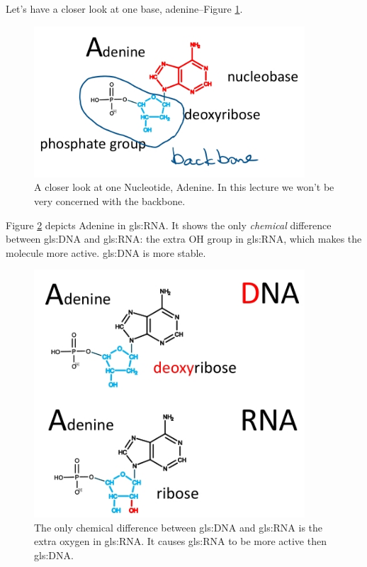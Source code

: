 \documentclass[]{article}
\begin{document}
Let's have a closer look at one base, adenine--Figure \ref{fig:NucleotideAdenine}.
\begin{figure}[H]
	\caption[A closer look at one Nucleotide, Adenine]{A closer look at one Nucleotide, Adenine. In this lecture we won't be very concerned with the backbone.}\label{fig:NucleotideAdenine} 
	\includegraphics[width=0.9\textwidth]{NucleotideAdenine}
\end{figure}

Figure \ref{fig:NucleotideDNARNA} depicts Adenine in \gls{gls:RNA}. It shows the only \emph{chemical} difference between \gls{gls:DNA} and \gls{gls:RNA}: the extra OH group in \gls{gls:RNA}, which makes the molecule more active. \gls{gls:DNA} is more stable.
\begin{figure}[H]
	\caption[Chemical difference between DNA and RNA is the extra oxygen]{The only chemical difference between \gls{gls:DNA} and \gls{gls:RNA} is the extra oxygen in \gls{gls:RNA}. It causes \gls{gls:RNA} to be more active then \gls{gls:DNA}.}\label{fig:NucleotideDNARNA} 
	\includegraphics[width=0.9\textwidth]{NucleotideDNARNA}
\end{figure}
\end{document}
